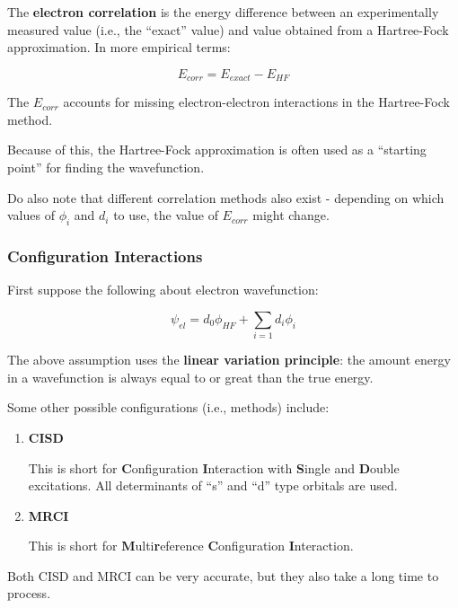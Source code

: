 \documentclass[
  letterpaper,
  DIV=11,
  numbers=noendperiod]{scrreprt}
\begin{document}
The \textbf{electron correlation} is the energy difference between an
experimentally measured value (i.e., the ``exact'' value) and value
obtained from a Hartree-Fock approximation. In more empirical terms:

\begin{equation}
  E_{corr} = E_{exact} - E_{HF}
\end{equation}

The \(E_{corr}\) accounts for missing electron-electron interactions in
the Hartree-Fock method.

Because of this, the Hartree-Fock approximation is often used as a
``starting point'' for finding the wavefunction.

Do also note that different correlation methods also exist - depending
on which values of \(\phi_i\) and \(d_i\) to use, the value of
\(E_{corr}\) might change.

\hypertarget{configuration-interactions}{%
\subsubsection{Configuration
Interactions}\label{configuration-interactions}}

First suppose the following about electron wavefunction:

\begin{equation}
  \psi_{el} = d_0\phi_{HF} + \sum_{i = 1}d_i\phi_i
\end{equation}

The above assumption uses the \textbf{linear variation principle}: the
amount energy in a wavefunction is always equal to or great than the
true energy.

Some other possible configurations (i.e., methods) include:

\begin{enumerate}
\def\labelenumi{\arabic{enumi}.}
\item
  \textbf{CISD}

  This is short for \textbf{C}onfiguration \textbf{I}nteraction with
  \textbf{S}ingle and \textbf{D}ouble excitations. All determinants of
  ``s'' and ``d'' type orbitals are used.
\item
  \textbf{MRCI}

  This is short for \textbf{M}ulti\textbf{r}eference
  \textbf{C}onfiguration \textbf{I}nteraction.
\end{enumerate}

Both CISD and MRCI can be very accurate, but they also take a long time
to process.
\end{document}
